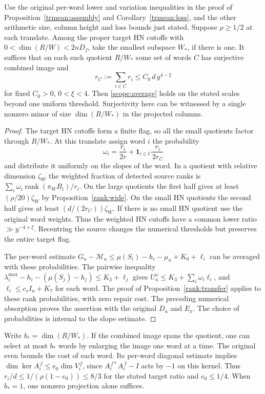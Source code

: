 \begin{corollary}\label{rank:one-minor}
Use the original per-word lower and variation inequalities in the
proof of Proposition~\ref{trmean:assembly} and
Corollary~\ref{trmean:loss}, and the other arithmetic size, column
height and loss bounds just stated. Suppose \(\rho\ge1/2\) at each
translate. Among the proper target HN cutoffs with
\(0<\dim(R/W)<2nD_f\), take the smallest subspace \(W_*\), if there
is one. It suffices that on each such quotient \(R/W_*\) some set
of words \(C\) has surjective combined image and
\[
                r_C:=\sum_{i\in C}r_i\le C_0\,d\,y^{4-\xi}
\]
for fixed \(C_0>0\), \(0<\xi<4\). Then \eqref{scope:average} holds
on the stated scales beyond one uniform threshold. Surjectivity
here can be witnessed by a single nonzero minor of size
\(\dim(R/W_*)\) in the projected columns.
\end{corollary}
\begin{proof}
The target HN cutoffs form a finite flag, so all the small quotients
factor through \(R/W_*\). At this translate assign word \(i\) the
probability
\[
                \omega_i=\frac{r_i}{2r}
                         +\mathbf1_{i\in C}\frac{r_i}{2r_C}
\]
and distribute it uniformly on the slopes of the word. In a quotient
with relative dimension \(\zeta_W\) the weighted fraction of
detected source ranks is
\(\sum_i\omega_i\operatorname{rank}(\pi_W B_i)/r_i\).
On the large quotients the first half gives at least
\((\rho/20)\zeta_W\) by Proposition~\ref{rank:wide}. On the small HN
quotients the second half gives at least \((d/(2r_C))\zeta_W\).
If there is no small HN quotient use the original word weights.
Thus the weighted HN cutoffs have a common lower ratio
\(\gg y^{-4+\xi}\). Recentring the source changes the numerical
thresholds but preserves the entire target flag.

The per-word estimate
\(G_u-\mathcal M_u\le\mu(S_i)-h_i-\mu_u+K_0+\ell_i\)
can be averaged with these probabilities. The pairwise inequality
\(\lambda_i^{\max}-h_i-(\mu(S_j)-h_j)\le K_3+\ell_j\)
gives \(U^\omega_u\le K_3+\sum_i\omega_i\ell_i\), and
\(\ell_i\le c_sI_u+K_7\) for each word. The proof of
Proposition~\ref{rank:transfer} applies to these rank probabilities,
with zero repair cost. The preceding numerical absorption proves
the assertion with the original \(D_u\) and \(E_x\). The choice of
probabilities is internal to the slope estimate.
\end{proof}

Write \(b_*=\dim(R/W_*)\). If the combined image spans the quotient,
one can select at most \(b_*\) words by enlarging the image one word
at a time. The original  even bounds the cost of each
word. Its per-word diagonal estimate implies
\(\dim\ker A_i^{\,f}\le e_0\dim V_i^{\,f}\), since
\(A_i^{\,f*}A_i^{\,f}-I\) acts by \(-1\) on this kernel. Thus
\(r_i/d\le1/(\rho(1-e_0))\le8/3\) for the stated target ratio and
\(e_0\le1/4\). When \(b_*=1\), one nonzero projection alone suffices.

